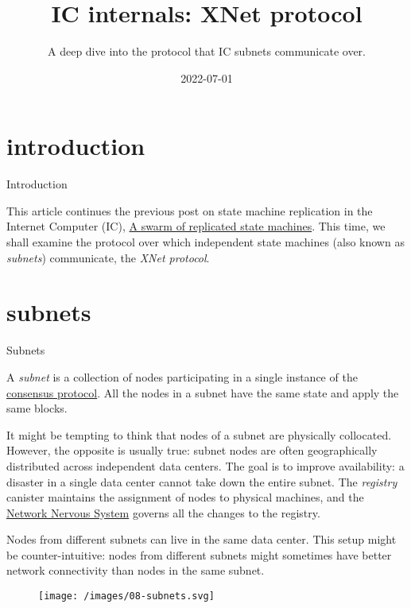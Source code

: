 \documentclass{article}
\title{IC internals: XNet protocol}
\subtitle{A deep dive into the protocol that IC subnets communicate over.}
\date{2022-07-01}
\begin{document}
\section{introduction}{Introduction}

This article continues the previous post on state machine replication in the Internet Computer (IC), \href{/posts/02-ic-state-machine-replication.html}{A swarm of replicated state machines}.
This time, we shall examine the protocol over which independent state machines (also known as \emph{subnets}) communicate, the \emph{XNet protocol}. 

\section{subnets}{Subnets}

A \emph{subnet} is a collection of nodes participating in a single instance of the \href{https://dfinity.org/howitworks/consensus}{consensus protocol}.
All the nodes in a subnet have the same state and apply the same blocks.

It might be tempting to think that nodes of a subnet are physically collocated.
However, the opposite is usually true: subnet nodes are often geographically distributed across independent data centers.
The goal is to improve availability: a disaster in a single data center cannot take down the entire subnet.
The \emph{registry} canister maintains the assignment of nodes to physical machines, and the \href{https://dfinity.org/howitworks/network-nervous-system-nns}{Network Nervous System} governs all the changes to the registry.

Nodes from different subnets can live in the same data center.
This setup might be counter-intuitive: nodes from different subnets might sometimes have better network connectivity than nodes in the same subnet.

\begin{figure}[grayscale-diagram]
  \texttt{[image: /images/08-subnets.svg]}
\end{figure}
\end{document}
